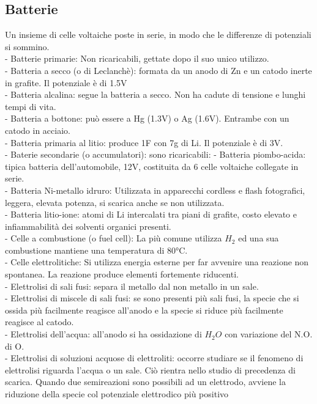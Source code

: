\subsection{Batterie}
Un insieme di celle voltaiche poste in serie, in modo che le differenze di potenziali si sommino.\\
\tab- Batterie primarie: Non ricaricabili, gettate dopo il suo unico utilizzo.\\
\tab\tab- Batteria a secco (o di Leclanchè): formata da un anodo di Zn e un catodo inerte in grafite. Il potenziale è di 1.5V\\
\tab\tab- Batteria alcalina: segue la batteria a secco. Non ha cadute di tensione e lunghi tempi di vita.\\
\tab\tab- Batteria a bottone: può essere a Hg (1.3V) o Ag (1.6V). Entrambe con un catodo in acciaio.\\
\tab\tab- Batteria primaria al litio: produce 1F con 7g di Li. Il potenziale è di 3V.\\
\tab- Baterie secondarie (o accumulatori): sono ricaricabili:
\tab\tab- Batteria piombo-acida: tipica batteria dell'automobile, 12V, costituita da 6 celle voltaiche collegate in serie.\\
\tab\tab- Batteria Ni-metallo idruro: Utilizzata in apparecchi cordless e flash fotografici, leggera, elevata potenza, si scarica anche se non utilizzata.\\
\tab\tab- Batteria litio-ione: atomi di Li intercalati tra piani di grafite, costo elevato e infiammabilità dei solventi organici presenti.\\
\tab- Celle a combustione (o fuel cell): La più comune utilizza $H_2$ ed una sua combustione mantiene una temperatura di 80°C.\\
\tab- Celle elettrolitiche: Si utilizza energia esterne per far avvenire una reazione non spontanea. La reazione produce elementi fortemente riducenti.\\
\tab\tab- Elettrolisi di sali fusi: separa il metallo dal non metallo in un sale.\\
\tab\tab- Elettrolisi di miscele di sali fusi: se sono presenti più sali fusi, la specie che si ossida più facilmente reagisce all'anodo e la specie si riduce più facilmente reagisce al catodo.\\
\tab\tab- Elettrolisi dell'acqua: all'anodo si ha ossidazione di $H_2O$ con variazione del N.O. di O.\\
\tab\tab- Elettrolisi di soluzioni acquose di elettroliti: occorre studiare se il fenomeno di elettrolisi riguarda l'acqua o un sale. Ciò rientra nello studio di precedenza di scarica. Quando due semireazioni sono possibili ad un elettrodo, avviene la riduzione della specie col potenziale elettrodico più positivo\\
